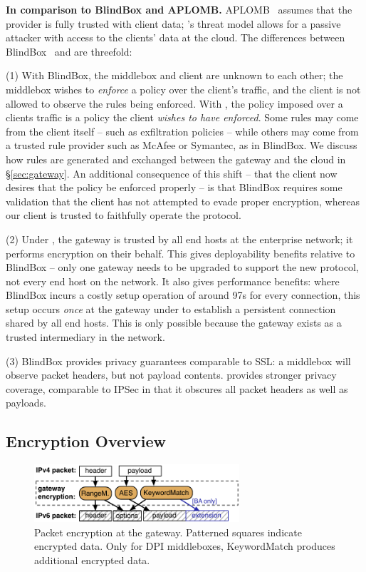 \textbf{In comparison to BlindBox and APLOMB.}
APLOMB~\cite{aplomb} assumes that the provider is fully trusted with client data; \sys's threat model allows for a passive attacker with access to the clients' data at the cloud.
The differences between BlindBox~\cite{blindbox} and \sys are threefold:

%
\noindent(1) With BlindBox, the middlebox and client are unknown to each other; the middlebox wishes to {\it enforce} a policy over the client's traffic, and the client is not allowed to observe the rules being enforced. With \sys, the policy imposed over a clients traffic is a policy the client {\it wishes to have enforced}. 
Some rules may come from the client itself -- such as exfiltration policies -- while others may come from a trusted rule provider such as McAfee or Symantec, as in BlindBox. We discuss how rules are generated and exchanged between the gateway and the cloud in \S\ref{sec:gateway}.
An additional consequence of this shift -- that the client now desires that the policy be enforced properly -- is that BlindBox requires some validation that the client has not attempted to evade proper encryption, whereas our client is trusted to faithfully operate the protocol.
%

\noindent(2) Under \sys, the gateway is trusted by all end hosts at the enterprise network; it performs encryption on their behalf. This gives \sys deployability benefits relative to BlindBox -- only one gateway needs to be upgraded to support the new protocol, not every end host on the network. It also gives performance benefits: where BlindBox incurs a costly setup operation of around 97s for every connection, this setup occurs {\it once} at the gateway under \sys to establish a persistent connection shared by all end hosts. This is only possible because the gateway exists as a trusted intermediary in the network.

\noindent(3) BlindBox provides privacy guarantees comparable to SSL: a middlebox will observe packet headers, but not payload contents. \sys provides stronger privacy coverage, comparable to IPSec in that it obscures all packet headers as well as payloads.

%
%
\subsection{Encryption Overview}
\begin{figure}[t!]
\centering
  \includegraphics[width=3.0in]{fig/packet.pdf}
\caption{Packet encryption at the gateway. Patterned squares indicate encrypted data. Only for DPI  middleboxes,  KeywordMatch produces additional encrypted data.   \label{fig:packet}}
\end{figure}


